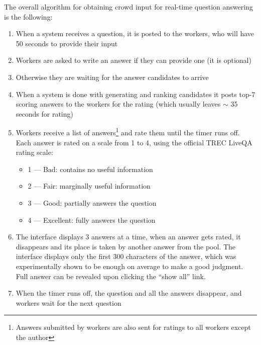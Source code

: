 The overall algorithm for obtaining crowd input for real-time question answering is the following:
\begin{enumerate}
\item When a system receives a question, it is posted to the workers, who will have 50 seconds to provide their input
\item Workers are asked to write an answer if they can provide one (it is optional)
\item Otherwise they are waiting for the answer candidates to arrive
\item When a system is done with generating and ranking candidates it posts top-7 scoring answers to the workers for the rating (which usually leaves $\sim$ 35 seconds for rating)
\item Workers receive a list of answers\footnote{Answers submitted by workers are also sent for ratings to all workers except the author} and rate them until the timer runs off. Each answer is rated on a scale from 1 to 4, using the official TREC LiveQA rating scale:
	\begin{itemize}
    \item 1 --- Bad: contains no useful information
    \item 2 --- Fair: marginally useful information
    \item 3 --- Good: partially answers the question
    \item 4 --- Excellent: fully answers the question
    \end{itemize}
\item The interface displays 3 answers at a time, when an answer gets rated, it disappears and its place is taken by another answer from the pool. The interface displays only the first 300 characters of the answer, which was experimentally shown to be enough on average to make a good judgment.
Full answer can be revealed upon clicking the ``show all'' link.
\item When the timer runs off, the question and all the answers disappear, and workers wait for the next question
\end{enumerate}

